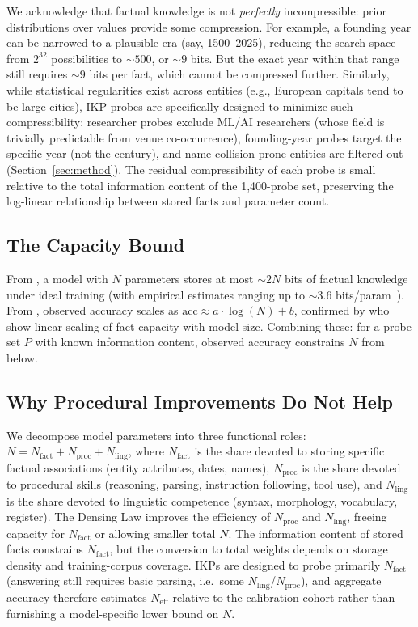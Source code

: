\documentclass[11pt]{article}
\begin{document}
We acknowledge that factual knowledge is not \emph{perfectly} incompressible: prior distributions over values provide some compression. For example, a founding year can be narrowed to a plausible era (say, 1500--2025), reducing the search space from $2^{32}$ possibilities to ${\sim}500$, or ${\sim}9$ bits. But the exact year within that range still requires ${\sim}9$ bits per fact, which cannot be compressed further. Similarly, while statistical regularities exist across entities (e.g., European capitals tend to be large cities), IKP probes are specifically designed to minimize such compressibility: researcher probes exclude ML/AI researchers (whose field is trivially predictable from venue co-occurrence), founding-year probes target the specific year (not the century), and name-collision-prone entities are filtered out (Section~\ref{sec:method}). The residual compressibility of each probe is small relative to the total information content of the 1{,}400-probe set, preserving the log-linear relationship between stored facts and parameter count.

\subsection{The Capacity Bound}

From \citet{allenzhu2025}, a model with $N$ parameters stores at most ${\sim}2N$ bits of factual knowledge under ideal training (with empirical estimates ranging up to ${\sim}3.6$ bits/param~\citep{morris2025memorize}). From \citet{kandpal2023}, observed accuracy scales as $\text{acc} \approx a \cdot \log(N) + b$, confirmed by \citet{lu2024factmemorization} who show linear scaling of fact capacity with model size. Combining these: for a probe set $P$ with known information content, observed accuracy constrains $N$ from below.

\subsection{Why Procedural Improvements Do Not Help}

We decompose model parameters into three functional roles: $N = N_{\text{fact}} + N_{\text{proc}} + N_{\text{ling}}$, where $N_{\text{fact}}$ is the share devoted to storing specific factual associations (entity attributes, dates, names), $N_{\text{proc}}$ is the share devoted to procedural skills (reasoning, parsing, instruction following, tool use), and $N_{\text{ling}}$ is the share devoted to linguistic competence (syntax, morphology, vocabulary, register). The Densing Law improves the efficiency of $N_{\text{proc}}$ and $N_{\text{ling}}$, freeing capacity for $N_{\text{fact}}$ or allowing smaller total $N$. The information content of stored facts constrains $N_{\text{fact}}$, but the conversion to total weights depends on storage density and training-corpus coverage. IKPs are designed to probe primarily $N_{\text{fact}}$ (answering still requires basic parsing, i.e.\ some $N_{\text{ling}}$/$N_{\text{proc}}$), and aggregate accuracy therefore estimates $N_{\mathrm{eff}}$ relative to the calibration cohort rather than furnishing a model-specific lower bound on $N$.
\end{document}
